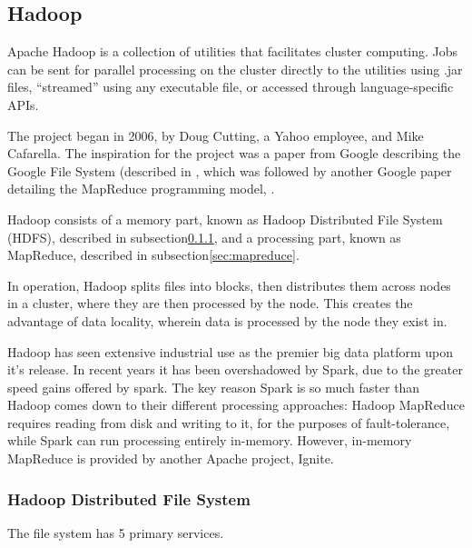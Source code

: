 \hypertarget{sec:hadoop-1}{%
    \subsection{Hadoop}\label{sec:hadoop-1}}

Apache Hadoop is a collection of utilities that facilitates cluster
computing. Jobs can be sent for parallel processing on the cluster
directly to the utilities using .jar files, ``streamed'' using any
executable file, or accessed through language-specific APIs.

The project began in 2006, by Doug Cutting, a Yahoo employee, and Mike
Cafarella. The inspiration for the project was a paper from Google
describing the Google File System (described in
\cite{ghemawat2003google}, which was followed by another Google paper
detailing the MapReduce programming model, \cite{dean2004mapreduce}.

Hadoop consists of a memory part, known as Hadoop Distributed File
System (HDFS), described in subsection\cref{sec:hdfs},
and a processing part, known as MapReduce, described in
subsection\cref{sec:mapreduce}.

In operation, Hadoop splits files into blocks, then distributes them
across nodes in a cluster, where they are then processed by the node.
This creates the advantage of data locality, wherein data is processed
by the node they exist in.

Hadoop has seen extensive industrial use as the premier big data
platform upon it's release. In recent years it has been overshadowed by
Spark, due to the greater speed gains offered by spark. The key reason
Spark is so much faster than Hadoop comes down to their different
processing approaches: Hadoop MapReduce requires reading from disk and
writing to it, for the purposes of fault-tolerance, while Spark can run
processing entirely in-memory. However, in-memory MapReduce is provided
by another Apache project, Ignite\cite{zheludkov2017high}.

\hypertarget{sec:hdfs}{%
    \subsubsection{Hadoop Distributed File System}\label{sec:hdfs}}

The file system has 5 primary services.

